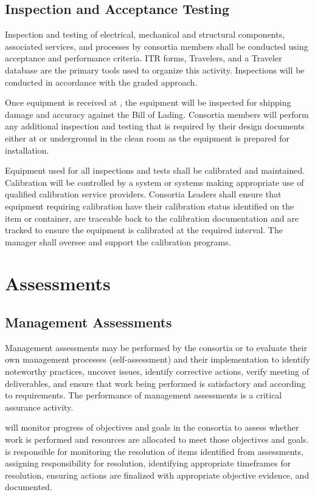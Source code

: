\subsection{Inspection and Acceptance Testing}

Inspection and testing of electrical, mechanical and structural
components, associated services, and processes by consortia members
shall be conducted using acceptance and performance criteria. ITR
forms, Travelers, and a Traveler database are the primary tools used
to organize this activity. Inspections will be conducted in accordance
with the graded approach.

Once equipment is received at , the equipment will 
be inspected for shipping damage and accuracy against the Bill of Lading. 
Consortia members will perform any additional inspection and testing that 
is required by their design documents either at  or 
underground in the clean room as the equipment is prepared for 
installation.

Equipment used for all inspections and tests shall be calibrated and
maintained. Calibration will be controlled by a system or systems
making appropriate use of qualified calibration service
providers. Consortia Leaders shall ensure that equipment requiring
calibration have their calibration status identified on the item or
container, are traceable back to the calibration documentation and are
tracked to ensure the equipment is calibrated at the required
interval. The   manager shall
oversee and support the  calibration programs.

\section{Assessments}

\subsection{Management Assessments}

Management assessments may be performed by the consortia or 
to evaluate their own management processes (self-assessment) and their
implementation to identify noteworthy practices, uncover issues,
identify corrective actions, verify meeting of deliverables, and
ensure that work being performed is satisfactory and according to
requirements. The performance of management assessments is a critical
assurance activity.

  will monitor progress
of objectives and goals in the consortia to assess whether work is
performed and resources are allocated to meet those objectives and
goals.    is responsible for monitoring the
resolution of items identified from assessments, assigning
responsibility for resolution, identifying appropriate timeframes for
resolution, ensuring actions are finalized with appropriate objective
evidence, and documented.

